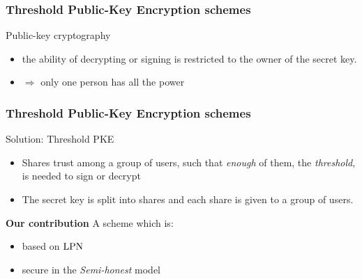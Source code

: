 \begin{frame}
\frametitle{Threshold Public-Key Encryption schemes}
\begin{block}{Public-key cryptography}
  \begin{itemize}
   \item the ability of decrypting or signing is restricted to the owner of the secret key.
   \item $\Rightarrow$ \alert{only one person has all the power} 
  \end{itemize}  
 \end{block}
 \end{frame}
 

 \begin{frame}
 \frametitle{Threshold Public-Key Encryption schemes}
 \begin{block}{Solution: Threshold PKE}
 \begin{itemize}
  \item Shares trust among a group of users, such that \emph{enough} of them, the \emph{threshold}, is needed to sign or decrypt
  \item The secret key is split into shares and each share is given to a group of users.
 \end{itemize}  
 \end{block}
 
 \begin{block}{\textbf{Our contribution}}
 A {\color{red}{Threshold Public-Key Encryption}} scheme which is:
 \begin{itemize}
   \item based on $\mathrm{LPN}$
   \item secure in the \emph{Semi-honest} model
  \end{itemize}

 \end{block}

\end{frame}

